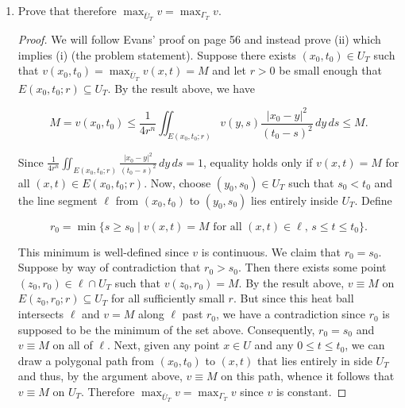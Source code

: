 \documentclass[11pt,oneside,english]{amsart}
\theoremstyle{definition}
\begin{document}
\begin{enumerate}
\begin{enumerate}
\begin{proof}
Consequently,

\[
v(0,0)\leq\frac{1}{4}\phi(r)=\frac{1}{4r^n}\iint_{E(r)} v(y,s)\frac{|y|^2}{s^2}\,dy\,ds
\]

so

\[
v(x,t)\leq \frac{1}{4r^n}\iint_{E(x,t;r)} v(y,s)\frac{|x-y|^2}{(t-s)^2}\,dy\,ds.
\]

Since $E(x,t;r)$ was chosen arbitrarily, this holds for all $E(x,t;r)\subset U_T$.
\end{proof}

\item Prove that therefore $\max_{\bar{U}_T} v=\max_{\Gamma_T}v$.

\begin{proof}
We will follow Evans' proof on page 56 and instead prove (ii) which implies (i) (the problem statement). Suppose there exists $(x_0,t_0)\in U_T$ such that $v(x_0,t_0)=\max_{\bar{U}_T}v(x,t)=M$ and let $r>0$ be small enough that $E(x_0,t_0;r)\subseteq U_T$. By the result above, we have

\[
M=v(x_0,t_0)\leq \frac{1}{4r^n}\iint_{E(x_0,t_0;r)} v(y,s)\frac{|x_0-y|^2}{(t_0-s)^2}\,dy\,ds\leq M.
\]

Since $ \frac{1}{4r^n}\iint_{E(x_0,t_0;r)} \frac{|x_0-y|^2}{(t_0-s)^2}\,dy\,ds=1$, equality holds only if $v(x,t)=M$ for all $(x,t)\in E(x_0,t_0;r)$. Now, choose $(y_0,s_0)\in U_T$ such that $s_0<t_0$ and the line segment $\ell$ from $(x_0,t_0)$ to $(y_0,s_0)$ lies entirely inside $U_T$. Define

\[
r_0=\min\{s\geq s_0\mid v(x,t)=M\text{ for all }(x,t)\in\ell,\,s\leq t\leq t_0\}.
\]

This minimum is well-defined since $v$ is continuous. We claim that $r_0=s_0$. Suppose by way of contradiction that $r_0>s_0$. Then there exists some point $(z_0, r_0)\in\ell\cap U_T$ such that $v(z_0,r_0)=M$. By the result above, $v\equiv M$ on $E(z_0,r_0;r)\subseteq U_T$ for all sufficiently small $r$. But since this heat ball intersects $\ell$ and $v=M$ along $\ell$ past $r_0$, we have a contradiction since $r_0$ is supposed to be the minimum of the set above. Consequently, $r_0=s_0$ and $v\equiv M$ on all of $\ell$. Next, given any point $x\in U$ and any $0\leq t\leq t_0$, we can draw a polygonal path from $(x_0,t_0)$ to $(x,t)$ that lies entirely in side $U_T$ and thus, by the argument above, $v\equiv M$ on this path, whence it follows that $v\equiv M$ on $U_T$. Therefore $\max_{\bar{U}_T} v=\max_{\Gamma_T}v$ since $v$ is constant.
\end{proof}


\end{enumerate}
\end{enumerate}
\end{document}
